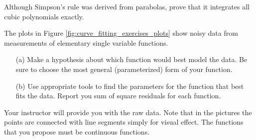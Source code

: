 \begin{problem}
    Although Simpson’s rule was derived from parabolas, prove that it integrates all cubic
    polynomials exactly.
\end{problem}


\newpage
\begin{problem}\label{prob:curve_fitting_exercises}
    The plots in Figure \ref{fig:curve_fitting_exercises_plots} show noisy data from
    measurements of elementary single variable functions.
    \begin{enumerate}
        \item[(a)] Make a hypothesis about which function would best model the data.  Be
            sure to choose the most general (parameterized) form of your function.
        \item[(b)] Use appropriate tools to find the parameters for the function that best
            fits the data.  Report you sum of square residuals for each function.
    \end{enumerate}
    Your instructor will provide you with the raw data.  Note that in the pictures the
    points are connected with line segments simply for visual effect.  The functions that
    you propose must be continuous functions.
\end{problem}

